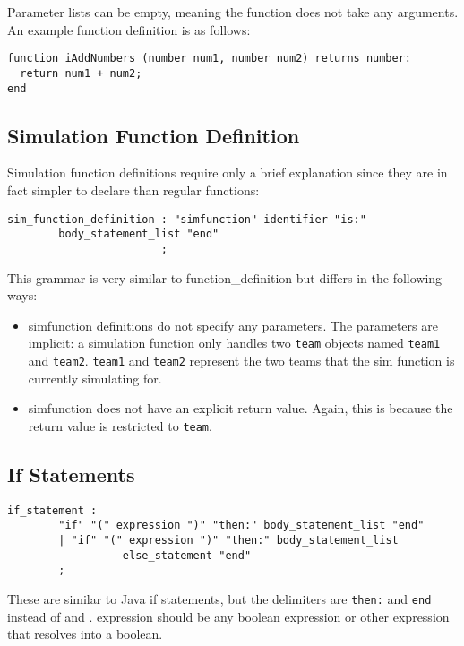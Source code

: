 Parameter lists can be empty, meaning the function does not take any
arguments. An example function definition is as follows:

\begin{verbatim}
function iAddNumbers (number num1, number num2) returns number:
  return num1 + num2;
end
\end{verbatim}

\subsection{Simulation Function Definition}\label{SimDef}
Simulation function definitions require only a brief explanation since
they are in fact simpler to declare than regular functions:

\begin{verbatim}
sim_function_definition : "simfunction" identifier "is:"
        body_statement_list "end"
                        ;
\end{verbatim}

This grammar is very similar to function\_definition but differs in the
following ways: 

\begin{itemize}
\item
  simfunction definitions do not specify any parameters. The
  parameters are implicit: a simulation function only handles two
  \texttt{team} objects named \texttt{team1} and
  \texttt{team2}. \texttt{team1} and \texttt{team2} represent the two
  teams that the sim function is currently simulating for.
\item
  simfunction does not have an explicit return value. Again, this is
  because the return value is restricted to \texttt{team}.
\end{itemize}

\subsection{If Statements}

\begin{verbatim}
if_statement : 
        "if" "(" expression ")" "then:" body_statement_list "end"
        | "if" "(" expression ")" "then:" body_statement_list
                  else_statement "end"
        ;
\end{verbatim}

These are similar to Java if statements, but the delimiters are
\texttt{then:} and \texttt{end} instead of { and }.  expression should
be any boolean expression or other expression that resolves into a
boolean.

